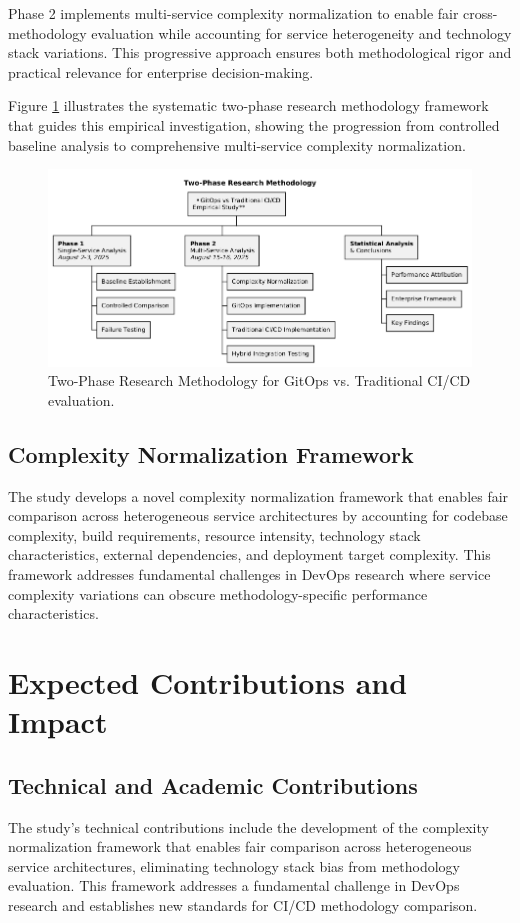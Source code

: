 Phase 2 implements multi-service complexity normalization to enable fair cross-methodology evaluation while accounting for service heterogeneity and technology stack variations. This progressive approach ensures both methodological rigor and practical relevance for enterprise decision-making.

Figure \ref{fig:research_methodology} illustrates the systematic two-phase research methodology framework that guides this empirical investigation, showing the progression from controlled baseline analysis to comprehensive multi-service complexity normalization.

\begin{figure}[H]
\centering
\includegraphics[width=\textwidth]{figures/research-methodology.png}
\caption{Two-Phase Research Methodology for GitOps vs. Traditional CI/CD evaluation.}
\label{fig:research_methodology}
\end{figure}

\subsection{Complexity Normalization Framework}
The study develops a novel complexity normalization framework that enables fair comparison across heterogeneous service architectures by accounting for codebase complexity, build requirements, resource intensity, technology stack characteristics, external dependencies, and deployment target complexity. This framework addresses fundamental challenges in DevOps research where service complexity variations can obscure methodology-specific performance characteristics.

\section{Expected Contributions and Impact}

\subsection{Technical and Academic Contributions}
The study's technical contributions include the development of the complexity normalization framework that enables fair comparison across heterogeneous service architectures, eliminating technology stack bias from methodology evaluation. This framework addresses a fundamental challenge in DevOps research and establishes new standards for CI/CD methodology comparison.

